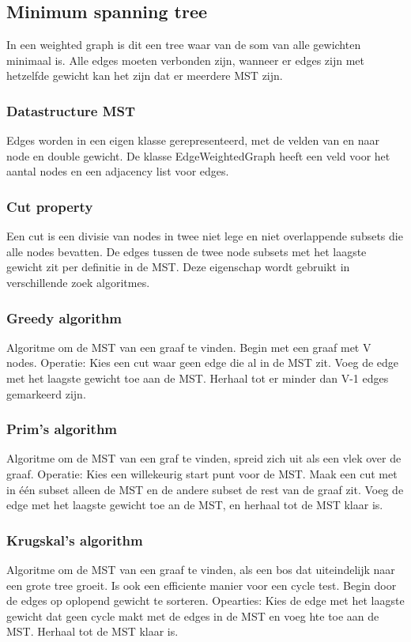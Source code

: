 \subsection{Minimum spanning tree}
In een weighted graph is dit een tree waar van de som van alle gewichten minimaal is.
Alle edges moeten verbonden zijn, wanneer er edges zijn met hetzelfde gewicht kan het zijn dat er meerdere MST zijn.

\subsubsection{Datastructure MST}
Edges worden in een eigen klasse gerepresenteerd, met de velden van en naar node en double gewicht.
De klasse EdgeWeightedGraph heeft een veld voor het aantal nodes en een adjacency list voor edges.

\subsubsection{Cut property}
Een cut is een divisie van nodes in twee niet lege en niet overlappende subsets die alle nodes bevatten.
De edges tussen de twee node subsets met het laagste gewicht zit per definitie in de MST.
Deze eigenschap wordt gebruikt in verschillende zoek algoritmes.

\subsubsection{Greedy algorithm}
Algoritme om de MST van een graaf te vinden.
Begin met een graaf met V nodes.
Operatie: 
Kies een cut waar geen edge die al in de MST zit.
Voeg de edge met het laagste gewicht toe aan de MST.
Herhaal tot er minder dan V-1 edges gemarkeerd zijn.

\subsubsection{Prim's algorithm}
Algoritme om de MST van een graf te vinden, spreid zich uit als een vlek over de graaf.
Operatie:
Kies een willekeurig start punt voor de MST.
Maak een cut met in \'e\'en subset alleen de MST en de andere subset de rest van de graaf zit.
Voeg de edge met het laagste gewicht toe an de MST, en herhaal tot de MST klaar is.

\subsubsection{Krugskal's algorithm}
Algoritme om de MST van een graaf te vinden, als een bos dat uiteindelijk naar een grote tree groeit.
Is ook een efficiente manier voor een cycle test.
Begin door de edges op oplopend gewicht te sorteren.
Opearties:
Kies de edge met het laagste gewicht dat geen cycle makt met de edges in de MST en voeg hte toe aan de MST.
Herhaal tot de MST klaar is.

